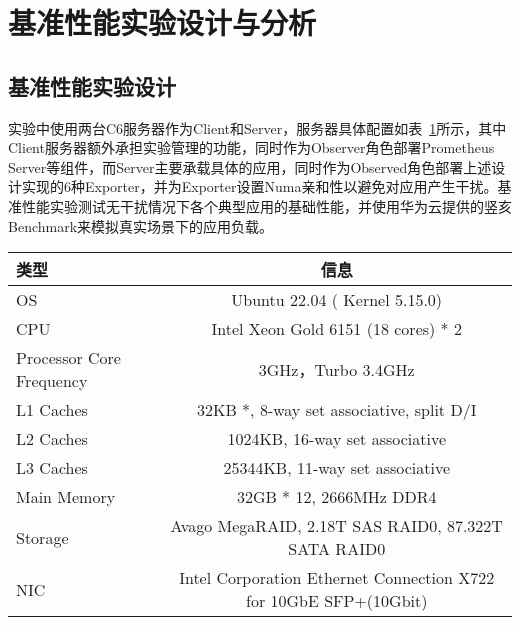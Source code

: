 \section{基准性能实验设计与分析}

\subsection{基准性能实验设计}

实验中使用两台C6服务器作为Client和Server，服务器具体配置如表~\ref{tab:c6_info}所示，其中Client服务器额外承担实验管理的功能，同时作为Observer角色部署Prometheus Server等组件，而Server主要承载具体的应用，同时作为Observed角色部署上述设计实现的6种Exporter，并为Exporter设置Numa亲和性以避免对应用产生干扰。基准性能实验测试无干扰情况下各个典型应用的基础性能，并使用华为云提供的竖亥Benchmark来模拟真实场景下的应用负载。

\begin{table}[!htbp]
    \label{tab:c6_info}
    \footnotesize%
    \setlength{\tabcolsep}{4pt}%
    \renewcommand{\arraystretch}{1.25}%
    \centering
    \begin{tabular}{lc}
        \hline
        类型 & 信息 \\
        \hline
        OS & Ubuntu 22.04 ( Kernel 5.15.0) \\
        CPU & Intel Xeon Gold 6151 (18 cores) * 2 \\
        Processor Core Frequency & 3GHz，Turbo 3.4GHz \\
        L1 Caches & 32KB *,  8-way set associative, split D/I \\
        L2 Caches & 1024KB, 16-way set associative \\
        L3 Caches & 25344KB, 11-way set associative \\
        Main Memory & 32GB * 12, 2666MHz DDR4 \\
        Storage & Avago MegaRAID, 2.18T SAS RAID0, 87.322T SATA RAID0 \\
        NIC & Intel Corporation Ethernet Connection X722 for 10GbE SFP+(10Gbit) \\
        \hline
    \end{tabular}
\end{table}



